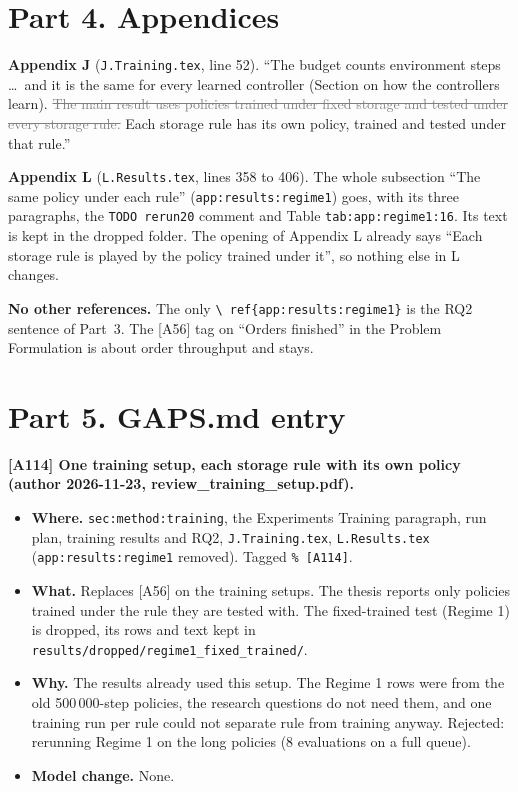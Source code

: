 \documentclass[11pt,a4paper]{article}
\newcommand{\new}[1]{\textcolor{newc}{#1}}
\newcommand{\old}[1]{\textcolor{gray}{\sout{#1}}}
\begin{document}
\section*{Part 4. Appendices}

\textbf{Appendix J} (\texttt{J.Training.tex}, line 52). ``The budget counts
environment steps \dots\ and it is the same for every learned controller
(Section on how the controllers learn).
\old{The main result uses policies trained under fixed storage and tested
under every storage rule.}
\new{Each storage rule has its own policy, trained and tested under that
rule.}''

\textbf{Appendix L} (\texttt{L.Results.tex}, lines 358 to 406). The whole
subsection ``The same policy under each rule''
(\texttt{app:results:regime1}) goes, with its three paragraphs, the
\texttt{TODO rerun20} comment and Table \texttt{tab:app:regime1:16}. Its
text is kept in the dropped folder. The opening of Appendix L already says
``Each storage rule is played by the policy trained under it'', so nothing
else in L changes.

\textbf{No other references.} The only \texttt{\textbackslash
ref\{app:results:regime1\}} is the RQ2 sentence of Part~3. The [A56] tag on
``Orders finished'' in the Problem Formulation is about order throughput and
stays.

\section*{Part 5. GAPS.md entry}

\textbf{[A114] One training setup, each storage rule with its own policy
(author 2026-11-23, review\_training\_setup.pdf).}
\begin{itemize}[nosep]
  \item \textbf{Where.} \texttt{sec:method:training}, the Experiments
        Training paragraph, run plan, training results and RQ2,
        \texttt{J.Training.tex},
        \texttt{L.Results.tex} (\texttt{app:results:regime1} removed).
        Tagged \texttt{\% [A114]}.
  \item \textbf{What.} Replaces [A56] on the training setups. The thesis
        reports only policies trained under the rule they are tested with.
        The fixed-trained test (Regime 1) is dropped, its rows and text kept
        in \texttt{results/dropped/regime1\_fixed\_trained/}.
  \item \textbf{Why.} The results already used this setup. The Regime 1 rows
        were from the old 500\,000-step policies, the research questions do
        not need them, and one training run per rule could not separate rule
        from training anyway. Rejected: rerunning Regime 1 on the long
        policies (8 evaluations on a full queue).
  \item \textbf{Model change.} None.
\end{itemize}
\end{document}
